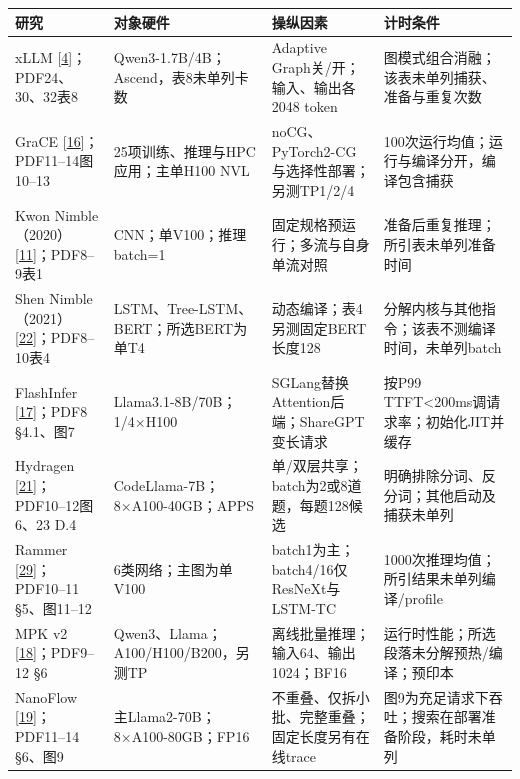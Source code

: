 \documentclass[
  11pt,
  UTF8]{ctexart}
\begin{document}
\begin{longtable}[]{@{}
  >{\raggedright\arraybackslash}p{}
  >{\raggedright\arraybackslash}p{}
  >{\raggedright\arraybackslash}p{}
  >{\raggedright\arraybackslash}p{}@{}}
\toprule
研究 & 对象硬件 & 操纵因素 & 计时条件 \\
\midrule
\endhead
xLLM {[}\protect\hyperlink{ref-liu2025xllm}{4}{]}；PDF24、30、32表8 &
Qwen3-1.7B/4B；Ascend，表8未单列卡数 & Adaptive
Graph关/开；输入、输出各2048 token &
图模式组合消融；该表未单列捕获、准备与重复次数 \\
GraCE
{[}\protect\hyperlink{ref-ghosh2026grace}{16}{]}；PDF11--14图10--13 &
25项训练、推理与HPC应用；主单H100 NVL &
noCG、PyTorch2-CG与选择性部署；另测TP1/2/4 &
100次运行均值；运行与编译分开，编译包含捕获 \\
Kwon
Nimble（2020）{[}\protect\hyperlink{ref-kwon2020nimble}{11}{]}；PDF8--9表1
& CNN；单V100；推理batch=1 & 固定规格预运行；多流与自身单流对照 &
准备后重复推理；所引表未单列准备时间 \\
Shen
Nimble（2021）{[}\protect\hyperlink{ref-shen2021nimble}{22}{]}；PDF8--10表4
& LSTM、Tree-LSTM、BERT；所选BERT为单T4 &
动态编译；表4另测固定BERT长度128 &
分解内核与其他指令；该表不测编译时间，未单列batch \\
FlashInfer {[}\protect\hyperlink{ref-ye2025flashinfer}{17}{]}；PDF8
§4.1、图7 & Llama3.1-8B/70B；1/4×H100 &
SGLang替换Attention后端；ShareGPT变长请求 & 按P99
TTFT\textless200ms调请求率；初始化JIT并缓存 \\
Hydragen
{[}\protect\hyperlink{ref-juravsky2024hydragen}{21}{]}；PDF10--12图6、23
D.4 & CodeLlama-7B；8×A100-40GB；APPS &
单/双层共享；batch为2或8道题，每题128候选 &
明确排除分词、反分词；其他启动及捕获未单列 \\
Rammer {[}\protect\hyperlink{ref-ma2020rammer}{29}{]}；PDF10--11
§5、图11--12 & 6类网络；主图为单V100 &
batch1为主；batch4/16仅ResNeXt与LSTM-TC &
1000次推理均值；所引结果未单列编译/profile \\
MPK v2 {[}\protect\hyperlink{ref-cheng2026mpk}{18}{]}；PDF9--12 §6 &
Qwen3、Llama；A100/H100/B200，另测TP &
离线批量推理；输入64、输出1024；BF16 &
运行时性能；所选段落未分解预热/编译；预印本 \\
NanoFlow {[}\protect\hyperlink{ref-zhu2025nanoflow}{19}{]}；PDF11--14
§6、图9 & 主Llama2-70B；8×A100-80GB；FP16 &
不重叠、仅拆小批、完整重叠；固定长度另有在线trace &
图9为充足请求下吞吐；搜索在部署准备阶段，耗时未单列 \\

\end{longtable}
\end{document}
